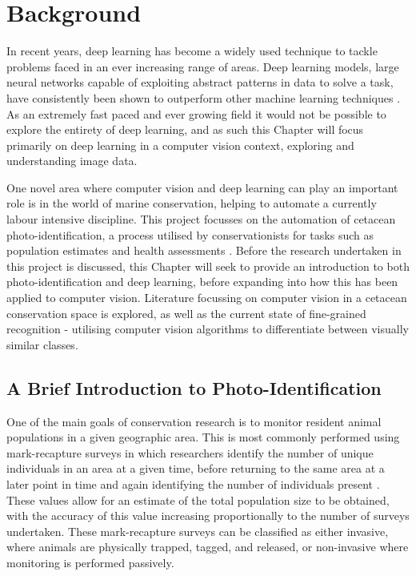 \chapter{Background}\label{ch:Background}

In recent years, deep learning has become a widely used technique to tackle problems faced in an ever increasing range of areas. Deep learning models, large neural networks capable of exploiting abstract patterns in data to solve a task, have consistently been shown to outperform other machine learning techniques \cite{lecun_deep_2015, zhang_machine_2017, korotcov_comparison_2017, paterakis_deep_2017}. As an extremely fast paced and ever growing field it would not be possible to explore the entirety of deep learning, and as such this Chapter will focus primarily on deep learning in a computer vision context, exploring and understanding image data. 

One novel area where computer vision and deep learning can play an important role is in the world of marine conservation, helping to automate a currently labour intensive discipline. This project focusses on the automation of cetacean photo-identification, a process utilised by conservationists for tasks such as population estimates and health assessments \cite{holmberg_estimating_2009, cheney_long-term_2014, lockyer_observations_1990, van_bressem_visual_2018}. Before the research undertaken in this project is discussed, this Chapter will seek to provide an introduction to both photo-identification and deep learning, before expanding into how this has been applied to computer vision. Literature focussing on computer vision in a cetacean conservation space is explored, as well as the current state of fine-grained recognition - utilising computer vision algorithms to differentiate between visually similar classes.

\section{A Brief Introduction to Photo-Identification}\label{ch:Background,sec:photo-id}

One of the main goals of conservation research is to monitor resident animal populations in a given geographic area. This is most commonly performed using mark-recapture surveys in which researchers identify the number of unique individuals in an area at a given time, before returning to the same area at a later point in time and again identifying the number of individuals present \cite{constantine_abundance_2012, bigg_assessment_1982, sharpe_indian_2019}. These values allow for an estimate of the total population size to be obtained, with the accuracy of this value increasing proportionally to the number of surveys undertaken. These mark-recapture surveys can be classified as either invasive, where animals are physically trapped, tagged, and released, or non-invasive where monitoring is performed passively. 

